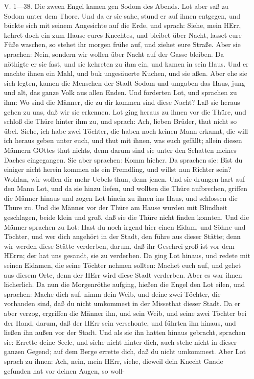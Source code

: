 \begin{schriftzitat}
V. 1—38. Die zween Engel kamen gen Sodom des Abends. Lot aber saß zu Sodom unter dem Thore. Und da er sie sahe, stund er auf ihnen entgegen, und bückte sich mit seinem Angesichte auf die Erde, und sprach: Siehe, mein HErr, kehret doch ein zum Hause eures Knechtes, und bleibet über Nacht, lasset eure Füße waschen, so stehet ihr morgen frühe auf, und ziehet eure Straße. Aber sie sprachen: Nein, sondern wir wollen über Nacht auf der Gasse bleiben. Da nöthigte er sie fast, und sie kehreten zu ihm ein, und kamen in sein Haus. Und er machte ihnen ein Mahl, und buk ungesäuerte Kuchen, und sie aßen. Aber ehe sie sich legten, kamen die Menschen der Stadt Sodom und umgaben das Haus, jung und alt, das ganze Volk aus allen Enden. Und forderten Lot, und sprachen zu ihm: Wo sind die Männer, die zu dir kommen sind diese Nacht? Laß sie heraus gehen zu uns, daß wir sie erkennen. Lot ging heraus zu ihnen vor die Thüre, und schloß die Thüre hinter ihm zu, und sprach: Ach, lieben Brüder, thut nicht so übel. Siehe, ich habe zwei Töchter, die haben noch keinen Mann erkannt, die will ich heraus geben unter euch, und thut mit ihnen, was euch gefällt; allein diesen Männern GOttes thut nichts, denn darum sind sie unter den Schatten meines Daches eingegangen. Sie aber sprachen: Komm hieher. Da sprachen sie: Bist du einiger nicht herein kommen als ein Fremdling, und willst nun Richter sein? Wohlan, wir wollen dir mehr Uebels thun, denn jenen. Und sie drungen hart auf den Mann Lot, und da sie hinzu liefen, und wollten die Thüre aufbrechen, griffen die Männer hinaus und zogen Lot hinein zu ihnen ins Haus, und schlossen die Thüre zu. Und die Männer vor der Thüre am Hause wurden mit Blindheit geschlagen, beide klein und groß, daß sie die Thüre nicht finden konnten. Und die Männer sprachen zu Lot: Hast du noch irgend hier einen Eidam, und Söhne und Töchter, und wer dich angehört in der Stadt, den führe aus dieser Stätte; denn wir werden diese Stätte verderben, darum, daß ihr Geschrei groß ist vor dem HErrn; der hat uns gesandt, sie zu verderben. Da ging Lot hinaus, und redete mit seinen Eidamen, die seine Töchter nehmen sollten: Machet euch auf, und gehet aus diesem Orte, denn der HErr wird diese Stadt verderben. Aber es war ihnen lächerlich. Da nun die Morgenröthe aufging, hießen die Engel den Lot eilen, und sprachen: Mache dich auf, nimm dein Weib, und deine zwei Töchter, die vorhanden sind, daß du nicht umkommest in der Missethat dieser Stadt. Da er aber verzog, ergriffen die Männer ihn, und sein Weib, und seine zwei Töchter bei der Hand, darum, daß der HErr sein verschonte, und führten ihn hinaus, und ließen ihn außen vor der Stadt. Und als sie ihn hatten hinaus gebracht, sprachen sie: Errette deine Seele, und siehe nicht hinter dich, auch stehe nicht in dieser ganzen Gegend; auf dem Berge errette dich, daß du nicht umkommest. Aber Lot sprach zu ihnen: Ach, nein, mein HErr, siehe, dieweil dein Knecht Gnade gefunden hat vor deinen Augen, so woll-



\end{schriftzitat}
